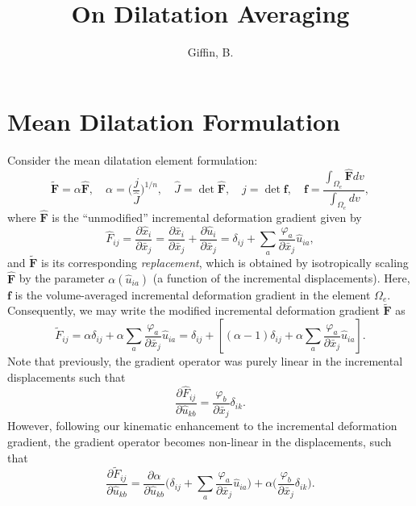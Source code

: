 \documentclass[11pt]{article} %
\title{\textbf{On Dilatation Averaging}}
\author{Giffin, B.}
\begin{document}
\maketitle

\section{Mean Dilatation Formulation}

Consider the mean dilatation element formulation:
\begin{equation}
	\tilde{\mathbf{F}} = \alpha \hat{\mathbf{F}}, \quad \alpha = \bigg( \frac{j}{\hat{J}} \bigg)^{1/n}, \quad \hat{J} = \det \hat{\mathbf{F}}, \quad j = \det \mathbf{f}, \quad \mathbf{f} = \frac{\int_{\Omega_e} \hat{\mathbf{F}} dv}{\int_{\Omega_e} dv},
\end{equation}
where $\hat{\mathbf{F}}$ is the ``unmodified'' incremental deformation gradient given by
\begin{equation}
	\hat{F}_{ij} = \frac{\partial \hat{x}_i}{\partial \bar{x}_j} = \frac{\partial \bar{x}_i}{\partial \bar{x}_j} + \frac{\partial \hat{u}_i}{\partial \bar{x}_j} = \delta_{ij} + \sum_a \frac{\varphi_{a}}{\partial \bar{x}_j} \hat{u}_{ia},
\end{equation}
and $\tilde{\mathbf{F}}$ is its corresponding \textit{replacement}, which is obtained by isotropically scaling $\hat{\mathbf{F}}$ by the parameter $\alpha (\hat{u}_{ia})$ (a function of the incremental displacements). Here, $\mathbf{f}$ is the volume-averaged incremental deformation gradient in the element $\Omega_e$. Consequently, we may write the modified incremental deformation gradient $\tilde{\mathbf{F}}$ as
\begin{equation}
	\tilde{F}_{ij} = \alpha \delta_{ij} + \alpha \sum_a \frac{\varphi_{a}}{\partial \bar{x}_j} \hat{u}_{ia} = \delta_{ij} + \left[ (\alpha - 1) \delta_{ij} + \alpha \sum_a \frac{\varphi_{a}}{\partial \bar{x}_j} \hat{u}_{ia} \right].
\end{equation}
Note that previously, the gradient operator was purely linear in the incremental displacements such that
\begin{equation}
	\frac{\partial \hat{F}_{ij}}{\partial \hat{u}_{kb}} = \frac{\varphi_{b}}{\partial \bar{x}_j} \delta_{ik}.
\end{equation}
However, following our kinematic enhancement to the incremental deformation gradient, the gradient operator becomes non-linear in the displacements, such that
\begin{equation}
	\frac{\partial \tilde{F}_{ij}}{\partial \hat{u}_{kb}} = \frac{\partial \alpha}{\partial \hat{u}_{kb}} \bigg(\delta_{ij} + \sum_a \frac{\varphi_{a}}{\partial \bar{x}_j} \hat{u}_{ia} \bigg) + \alpha \bigg( \frac{\varphi_{b}}{\partial \bar{x}_j} \delta_{ik} \bigg).
\end{equation}
\end{document}
